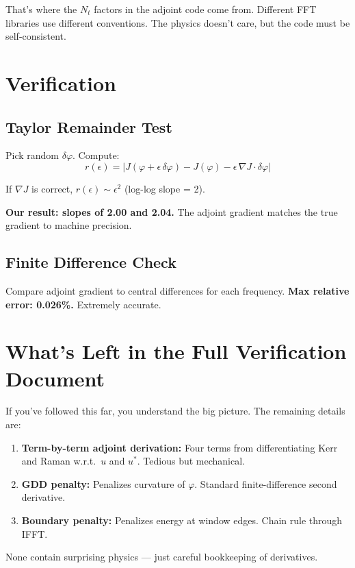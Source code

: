 \documentclass[12pt,a4paper]{article}
\begin{document}
That's where the $N_t$ factors in the adjoint code come from. Different FFT libraries use different conventions. The physics doesn't care, but the code must be self-consistent.


\section{Verification}

\subsection{Taylor Remainder Test}

Pick random $\delta\varphi$. Compute:
\begin{equation}
r(\epsilon) = |J(\varphi + \epsilon\,\delta\varphi) - J(\varphi) - \epsilon\,\nabla J\cdot\delta\varphi|
\end{equation}

If $\nabla J$ is correct, $r(\epsilon) \sim \epsilon^2$ (log-log slope = 2).

\textbf{Our result: slopes of 2.00 and 2.04.} The adjoint gradient matches the true gradient to machine precision.

\subsection{Finite Difference Check}

Compare adjoint gradient to central differences for each frequency. \textbf{Max relative error: 0.026\%.} Extremely accurate.


\section{What's Left in the Full Verification Document}

If you've followed this far, you understand the big picture. The remaining details are:
\begin{enumerate}
    \item \textbf{Term-by-term adjoint derivation:} Four terms from differentiating Kerr and Raman w.r.t.\ $u$ and $u^*$. Tedious but mechanical.
    \item \textbf{GDD penalty:} Penalizes curvature of $\varphi$. Standard finite-difference second derivative.
    \item \textbf{Boundary penalty:} Penalizes energy at window edges. Chain rule through IFFT.
\end{enumerate}
None contain surprising physics --- just careful bookkeeping of derivatives.
\end{document}

